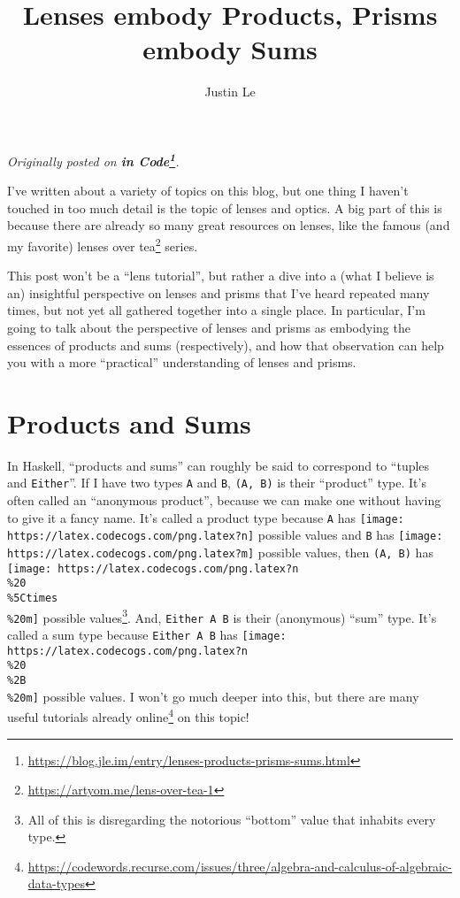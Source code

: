 \documentclass[]{article}
\title{Lenses embody Products, Prisms embody Sums}
\author{Justin Le}
\renewcommand{\href}[2]{#2\footnote{\url{#1}}}
\begin{document}
\maketitle

\emph{Originally posted on
\textbf{\href{https://blog.jle.im/entry/lenses-products-prisms-sums.html}{in
Code}}.}

I've written about a variety of topics on this blog, but one thing I haven't
touched in too much detail is the topic of lenses and optics. A big part of this
is because there are already so many great resources on lenses, like the famous
(and my favorite) \href{https://artyom.me/lens-over-tea-1}{lenses over tea}
series.

This post won't be a ``lens tutorial'', but rather a dive into a (what I believe
is an) insightful perspective on lenses and prisms that I've heard repeated many
times, but not yet all gathered together into a single place. In particular, I'm
going to talk about the perspective of lenses and prisms as embodying the
essences of products and sums (respectively), and how that observation can help
you with a more ``practical'' understanding of lenses and prisms.

\hypertarget{products-and-sums}{%
\section{Products and Sums}\label{products-and-sums}}

In Haskell, ``products and sums'' can roughly be said to correspond to ``tuples
and \texttt{Either}''. If I have two types \texttt{A} and \texttt{B},
\texttt{(A,\ B)} is their ``product'' type. It's often called an ``anonymous
product'', because we can make one without having to give it a fancy name. It's
called a product type because \texttt{A} has
\texttt{[image: https://latex.codecogs.com/png.latex?n]} possible values and
\texttt{B} has \texttt{[image: https://latex.codecogs.com/png.latex?m]} possible
values, then \texttt{(A,\ B)} has
\texttt{[image: https://latex.codecogs.com/png.latex?n\\\%20\\\%5Ctimes\\\%20m]}
possible values\footnote{All of this is disregarding the notorious ``bottom''
  value that inhabits every type.}. And, \texttt{Either\ A\ B} is their
(anonymous) ``sum'' type. It's called a sum type because \texttt{Either\ A\ B}
has \texttt{[image: https://latex.codecogs.com/png.latex?n\\\%20\\\%2B\\\%20m]}
possible values. I won't go much deeper into this, but there are
\href{https://codewords.recurse.com/issues/three/algebra-and-calculus-of-algebraic-data-types}{many
useful tutorials already online} on this topic!
\end{document}
